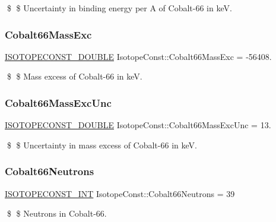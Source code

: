 \$ \$ Uncertainty in binding energy per A of Cobalt-\/66 in keV. \mbox{\label{group___isotope_const-_cobalt-_co66_ga946fee28f61429e761521b1a4e7169a6}} 
\subsubsection{\texorpdfstring{Cobalt66\+Mass\+Exc}{Cobalt66MassExc}}
{\footnotesize\ttfamily \mbox{\hyperlink{group___isotope_const-_macros_ga8f45a7272ce02c0b4c65c44636ed719a}{I\+S\+O\+T\+O\+P\+E\+C\+O\+N\+S\+T\+\_\+\+D\+O\+U\+B\+LE}} Isotope\+Const\+::\+Cobalt66\+Mass\+Exc = -\/56408.}

\$ \$ Mass excess of Cobalt-\/66 in keV. \mbox{\label{group___isotope_const-_cobalt-_co66_gac9fa8ef7a28b7d0e6df8f4ea871ded3d}} 
\subsubsection{\texorpdfstring{Cobalt66\+Mass\+Exc\+Unc}{Cobalt66MassExcUnc}}
{\footnotesize\ttfamily \mbox{\hyperlink{group___isotope_const-_macros_ga8f45a7272ce02c0b4c65c44636ed719a}{I\+S\+O\+T\+O\+P\+E\+C\+O\+N\+S\+T\+\_\+\+D\+O\+U\+B\+LE}} Isotope\+Const\+::\+Cobalt66\+Mass\+Exc\+Unc = 13.}

\$ \$ Uncertainty in mass excess of Cobalt-\/66 in keV. \mbox{\label{group___isotope_const-_cobalt-_co66_ga19dc6760cf5fea107b61b0d1f699dc3a}} 
\subsubsection{\texorpdfstring{Cobalt66\+Neutrons}{Cobalt66Neutrons}}
{\footnotesize\ttfamily \mbox{\hyperlink{group___isotope_const-_macros_ga5f18360b3e99483a35c32d789e62621c}{I\+S\+O\+T\+O\+P\+E\+C\+O\+N\+S\+T\+\_\+\+I\+NT}} Isotope\+Const\+::\+Cobalt66\+Neutrons = 39}

\$ \$ Neutrons in Cobalt-\/66. \mbox{\label{group___isotope_const-_cobalt-_co66_ga4cee81ba35179fd734057518c8e28585}} 

